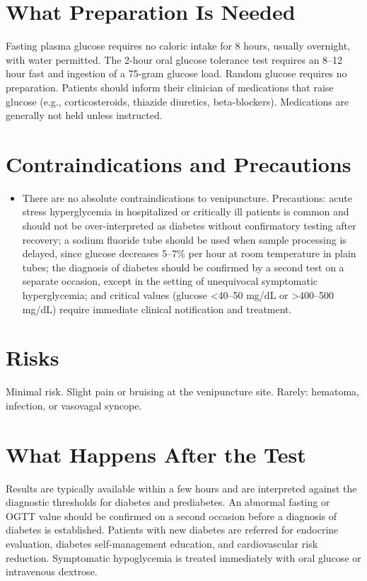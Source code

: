 \section*{What Preparation Is Needed}
Fasting plasma glucose requires no caloric intake for 8 hours, usually overnight, with water permitted. The 2-hour oral glucose tolerance test requires an 8--12 hour fast and ingestion of a 75-gram glucose load. Random glucose requires no preparation. Patients should inform their clinician of medications that raise glucose (e.g., corticosteroids, thiazide diuretics, beta-blockers). Medications are generally not held unless instructed.
\section*{Contraindications and Precautions}
\begin{itemize}
  \item There are no absolute contraindications to venipuncture. Precautions: acute stress hyperglycemia in hospitalized or critically ill patients is common and should not be over-interpreted as diabetes without confirmatory testing after recovery; a sodium fluoride tube should be used when sample processing is delayed, since glucose decreases 5--7\% per hour at room temperature in plain tubes; the diagnosis of diabetes should be confirmed by a second test on a separate occasion, except in the setting of unequivocal symptomatic hyperglycemia; and critical values (glucose <40--50 mg/dL or >400--500 mg/dL) require immediate clinical notification and treatment.
\end{itemize}
\section*{Risks}
Minimal risk. Slight pain or bruising at the venipuncture site. Rarely: hematoma, infection, or vasovagal syncope.
\section*{What Happens After the Test}
Results are typically available within a few hours and are interpreted against the diagnostic thresholds for diabetes and prediabetes. An abnormal fasting or OGTT value should be confirmed on a second occasion before a diagnosis of diabetes is established. Patients with new diabetes are referred for endocrine evaluation, diabetes self-management education, and cardiovascular risk reduction. Symptomatic hypoglycemia is treated immediately with oral glucose or intravenous dextrose.
